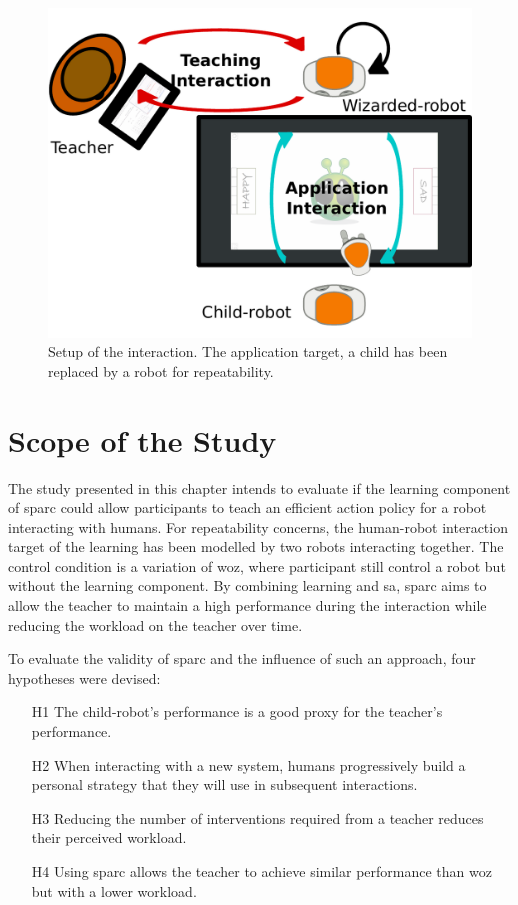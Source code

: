 \begin{figure}[ht]
	\centering
	\includegraphics[width=.8\textwidth]{setup_diag.pdf}
	\caption{Setup of the interaction. The application target, a child has been replaced by a robot for repeatability.}
	\label{fig:woz_setup_diag}
\end{figure}

\section{Scope of the Study}
The study presented in this chapter intends to evaluate if the learning component of \gls{sparc} could allow participants to teach an efficient action policy for a robot interacting with humans. For repeatability concerns, the human-robot interaction target of the learning has been modelled by two robots interacting together. The control condition is a variation of \gls{woz}, where participant still control a robot but without the learning component. By combining learning and \gls{sa}, \gls{sparc} aims to allow the teacher to maintain a high performance during the interaction while reducing the workload on the teacher over time.

To evaluate the validity of \gls{sparc} and the influence of such an approach, four hypotheses were devised:
\begin{enumerate}
	\item [H1] The child-robot's performance is a good proxy for the teacher's performance.
	\item [H2] When interacting with a new system, humans progressively build a personal strategy that they will use in subsequent interactions.
	\item [H3] Reducing the number of interventions required from a teacher reduces their perceived workload.
	\item [H4] Using \gls{sparc} allows the teacher to achieve similar performance than \gls{woz} but with a lower workload.
\end{enumerate}

